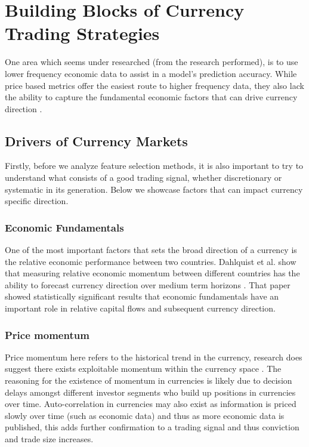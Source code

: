 \documentclass[11pt, a4paper]{article}
\begin{document}
\clearpage
\section{Building Blocks of Currency Trading Strategies}
One area which seems under researched (from the research performed), is to use lower frequency economic data to assist in a model's prediction accuracy. While price based metrics offer the easiest route to higher frequency data, they also lack the ability to capture the fundamental economic factors that can drive currency direction \cite{medium}. 

\subsection{Drivers of Currency Markets}

Firstly, before we analyze feature selection methods, it is also important to try to understand what consists of a good trading signal, whether discretionary or systematic in its generation. Below we showcase factors that can impact currency specific direction.
\subsubsection{Economic Fundamentals}
One of the most important factors that sets the broad direction of a currency is the relative economic performance between two countries.
Dahlquist et al. show that measuring relative economic momentum between different countries has the ability to forecast currency direction over medium term horizons \cite{Dahlquist2015}. That paper showed statistically significant results that economic fundamentals have an important role in relative capital flows and subsequent currency direction.
\subsubsection{Price momentum}
Price momentum here refers to the historical trend in the currency,  research does suggest there exists  exploitable momentum within the currency space \cite{Moskowitz2012}. The reasoning for the existence of momentum in currencies is likely due to decision delays amongst different investor segments who build up positions in currencies over time. Auto-correlation in currencies may also exist as information is priced slowly over time (such as economic data) and thus as more economic data is published, this adds further confirmation to a trading signal and thus conviction and trade size increases.
\end{document}

